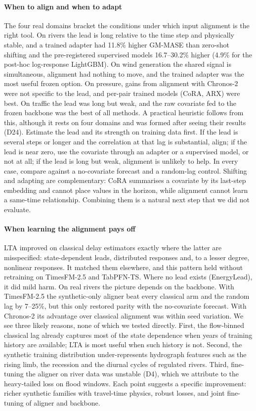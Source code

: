 \documentclass[preprint,11pt,authoryear]{elsarticle}
\newcommand{\lta}{\textsc{LTA}}
\begin{document}
\paragraph{When to align and when to adapt} The four real domains bracket the conditions under which input alignment is the right tool. On rivers the lead is long relative to the time step and physically stable, and a trained adapter had 11.8\% higher GM-MASE than zero-shot shifting and the pre-registered supervised models 16.7--30.2\% higher (4.9\% for the post-hoc log-response LightGBM). On wind generation the shared signal is simultaneous, alignment had nothing to move, and the trained adapter was the most useful frozen option. On pressure, gains from alignment with Chronos-2 were not specific to the lead, and per-pair trained models (CoRA, ARX) were best. On traffic the lead was long but weak, and the raw covariate fed to the frozen backbone was the best of all methods. A practical heuristic follows from this, although it rests on four domains and was formed after seeing their results (D24). Estimate the lead and its strength on training data first. If the lead is several steps or longer and the correlation at that lag is substantial, align; if the lead is near zero, use the covariate through an adapter or a supervised model, or not at all; if the lead is long but weak, alignment is unlikely to help. In every case, compare against a no-covariate forecast and a random-lag control. Shifting and adapting are complementary: CoRA summarises a covariate by its last-step embedding and cannot place values in the horizon, while alignment cannot learn a same-time relationship. Combining them is a natural next step that we did not evaluate.

\paragraph{When learning the alignment pays off} \lta{} improved on classical delay estimators exactly where the latter are misspecified: state-dependent leads, distributed responses and, to a lesser degree, nonlinear responses. It matched them elsewhere, and this pattern held without retraining on TimesFM-2.5 and TabPFN-TS. Where no lead exists (EnergyLead), it did mild harm. On real rivers the picture depends on the backbone. With TimesFM-2.5 the synthetic-only aligner beat every classical arm and the random lag by 7--25\%, but this only restored parity with the no-covariate forecast. With Chronos-2 its advantage over classical alignment was within seed variation. We see three likely reasons, none of which we tested directly. First, the flow-binned classical lag already captures most of the state dependence when years of training history are available; \lta{} is most useful when such history is not. Second, the synthetic training distribution under-represents hydrograph features such as the rising limb, the recession and the diurnal cycles of regulated rivers. Third, fine-tuning the aligner on river data was unstable (D4), which we attribute to the heavy-tailed loss on flood windows. Each point suggests a specific improvement: richer synthetic families with travel-time physics, robust losses, and joint fine-tuning of aligner and backbone.
\end{document}
